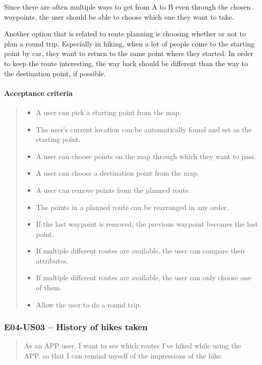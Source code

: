 Since there are often multiple ways to get from A to B even through the chosen waypoints, the user should be able to choose which one they want to take.

Another option that is related to route planning is choosing whether or not to plan a round trip.
Especially in hiking, when a lot of people come to the starting point by car, they want to return to the same point where they started.
In order to keep the route interesting, the way back should be different than the way to the destination point, if possible.

\paragraph*{Acceptance criteria}
\begin{quote}
\begin{itemize}
    \item A user can pick a starting point from the map.
    \item The user's current location can be automatically found and set as the starting point.
    \item A user can choose points on the map through which they want to pass.
    \item A user can choose a destination point from the map.
    \item A user can remove points from the planned route.
    \item The points in a planned route can be rearranged in any order.
    \item If the last waypoint is removed, the previous waypoint becomes the last point.
    \item If multiple different routes are available, the user can compare their attributes.
    \item If multiple different routes are available, the user can only choose one of them.
    \item Allow the user to do a round trip.
\end{itemize}
\end{quote}

\subsubsection*{E04-US03 -- History of hikes taken}
\begin{quote}
As an APP user, I want to see which routes I've hiked while using the APP, so that I can remind myself of the impressions of the hike.
\end{quote}

